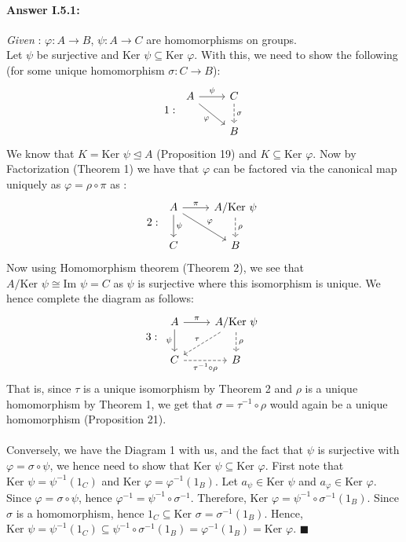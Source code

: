 \documentclass{article}
\theoremstyle{definition}
\theoremstyle{remark}
\theoremstyle{definition}
\theoremstyle{definition}
\newenvironment{customproof}[1]{\paragraph{Answer #1:}}{\hfill\ensuremath{\blacksquare}}
\newcommand{\inv}[1]{#1^{-1}}
\newcommand{\image}[0]{\text{Im }}
\newcommand{\kernel}[0]{\text{Ker }}
\newcommand{\nsg}[0]{\trianglelefteq}
\newcommand{\isomorph}{\cong}
\begin{document}
\hrulefill
\begin{customproof}{I.5.1}
	\emph{Given} : $ \varphi : A\to B $, $ \psi : A \to C $ are homomorphisms on groups. \\
	Let $ \psi $ be surjective and $ \kernel \psi \subseteq \kernel \varphi $. With this, we need to show the following (for some unique homomorphism $ \sigma: C\to B $):
	\[1:\;\begin{tikzcd}
		A \arrow{r}{\psi} \arrow[swap]{dr}{\varphi} &C\arrow[dashed]{d}{\sigma}\\
		&B 
	\end{tikzcd}\]	
We know that $ K = \kernel \psi \nsg A $ (Proposition 19) and $ K \subseteq \kernel\varphi $. Now by Factorization (Theorem 1) we have that $ \varphi $ can be factored via the canonical map uniquely as $ \varphi = \rho\circ \pi $ as :
\[2: \;\begin{tikzcd}
	A \arrow{dr}{\varphi}\arrow{d}{\psi}\arrow{r}{\pi} &A/\kernel \psi \arrow[dashed]{d}{\rho} \\
	C&B 
\end{tikzcd}\]
Now using Homomorphism theorem (Theorem 2), we see that $ A/\kernel \psi \isomorph \image\psi = C$ as $ \psi $ is surjective where this isomorphism is unique. We hence complete the diagram as follows:
\[3:\;\begin{tikzcd}
	A \arrow[swap]{d}{\psi}\arrow{r}{\pi} &A/\kernel \psi \arrow[dashed,swap]{dl}{\tau} \arrow[dashed]{d}{\rho} \\
	C\arrow[dashed,swap]{r}{\inv{\tau}\circ \rho}&B 
\end{tikzcd} \]
That is, since $ \tau $ is a unique isomorphism by Theorem 2 and $ \rho $ is a unique homomorphism by Theorem 1, we get that $ \sigma =\inv{\tau}\circ \rho $ would again be a unique homomorphism (Proposition 21).\\\\
Conversely, we have the Diagram 1 with us, and the fact that $ \psi $ is surjective with $ \varphi = \sigma \circ \psi $, we hence need to show that $ \kernel \psi \subseteq \kernel \varphi $. 
First note that $ \kernel \psi = \inv{\psi}(1_C) $ and $ \kernel \varphi = \inv{\varphi}(1_B) $. Let $ a_\psi \in \kernel \psi$ and $ a_\varphi \in \kernel \varphi $. Since $ \varphi = \sigma \circ \psi $, hence $ \inv{\varphi} = \inv{\psi}\circ \inv{\sigma} $. Therefore, $ \kernel \varphi = \inv{\psi}\circ \inv{\sigma}(1_B) $. Since $ \sigma $ is a homomorphism, hence $1_C \subseteq \kernel \sigma = \inv{\sigma}(1_B)$. Hence, $ \kernel\psi = \inv{\psi} (1_C) \subseteq \inv{\psi} \circ \inv{\sigma}(1_B) = \inv{\varphi}(1_B) = \kernel \varphi $.
\end{customproof}
\end{document}

